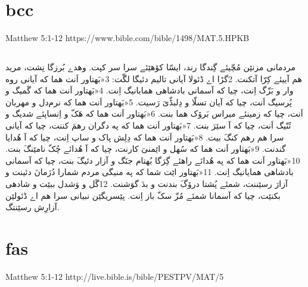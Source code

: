 \documentclass[12pt,fleqn,titlepage,twoside,a4paper]{book}
\begin{document}
\section{bcc}

Matthew 5:1-12 https://www.bible.com/bible/1498/MAT.5.HPKB

\begin{arab}[utf]
\section*{}


مردمانی مزنێن مُچّیئے گِندگا رند، ایسّا کۆهێئے سرا سر کپت. وهدے بُرزگا نِشت، مرید هم آییئے کِرّا آتکنت. 2گڑا اے ڈئولا آیانی تالیم دئیگا لگّت:
3«بَهتاور اَنت هما که آیانی روه وار و بَزّگ اِنت، چیا که آسمانی بادشاهی همایانیگ اِنت.
4«بَهتاور اَنت هما که گَمیگ و پُرسیگ اَنت، چیا که آیان تسلّا و دِلبڈّیَ رَسیت.
5«بَهتاور اَنت هما که نرم‌دل و مهربان اَنت، چیا که زمینئے میراس بَرۆک هما بنت.
6«بَهتاور اَنت هما که هَکّ و اِنساپئے شدیگ و تُنّیگ اَنت، چیا که آ سێرَ بنت.
7«بَهتاور اَنت هما که په دگران رهمَ کننت، چیا که آیانی سرا هم رهم کنگَ بیت.
8«بَهتاور اَنت هما که دِلِش پاک و ساپ اِنت، چیا که آ هُدایا گندنت.
9«بَهتاور اَنت هما که سُهل و اێمنیَ کارنت، چیا که آ هُدائے چُکّ نامێنگَ بنت.
10«بَهتاور اَنت هما که په هُدائے راهئے گِرَگا بُهتام جنَگ و آزار دئیگَ بنت، چیا که آسمانی بادشاهی همایانیگ اِنت.
11«بَهتاور اێت شما که په منیگی مردم شمارا دُژمانَ دئینت و آزارَ رسێننت، شمئے پُشتا درۆگَ بندنت و بدَ گوَشنت. 12گَل و وَشدل ببێت و شادهی بکنێت، چیا که آسمانا شمئے مُزّ سکّ باز اِنت. پێسریگێن نبیانی سرا هم اے ڈئولێن آزارِش رسێنتگ.

\end{arab}

\section{fas}

Matthew 5:1-12 http://live.bible.is/bible/PESTPV/MAT/5
\end{document}

